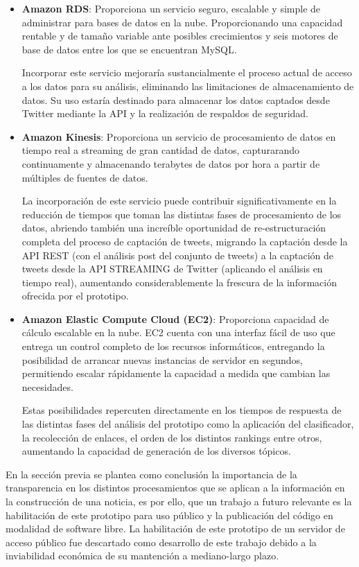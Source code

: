 	\begin{itemize}
		\item \textbf{Amazon RDS}: Proporciona un servicio seguro, escalable y simple de administrar para bases de datos en la nube. Proporcionando una capacidad rentable y de tamaño variable ante posibles crecimientos y seis motores de base de datos entre los que se encuentran MySQL.
		
		Incorporar este servicio mejoraría sustancialmente el proceso actual de acceso a los datos para su análisis, eliminando las limitaciones de almacenamiento de datos. Su uso estaría destinado para almacenar los datos captados desde Twitter mediante la API y la realización de respaldos de seguridad.
		
		\item \textbf{Amazon Kinesis}: Proporciona un servicio de procesamiento de datos en tiempo real a streaming de gran cantidad de datos, capturarando continuamente y almacenando terabytes de datos por hora a partir de múltiples de fuentes de datos.
		
		La incorporación de este servicio puede contribuir significativamente en la reducción de tiempos que toman las distintas fases de procesamiento de los datos, abriendo también una increíble oportunidad de  re-estructuración completa del proceso de captación de tweets, migrando  la captación desde la API REST (con el análisis post del conjunto de tweets) a la captación de tweets desde la API STREAMING de Twitter (aplicando el análisis en tiempo real), aumentando considerablemente la frescura de la información ofrecida por el prototipo.
		
		\item \textbf{Amazon Elastic Compute Cloud (EC2)}: Proporciona capacidad de cálculo escalable en la nube. EC2 cuenta con una interfaz fácil de uso que entrega un control completo de los recursos informáticos, entregando la posibilidad de arrancar nuevas instancias de servidor en segundos, permitiendo escalar rápidamente la capacidad a medida que cambian las necesidades.
		
		Estas posibilidades repercuten directamente en los tiempos de respuesta de las distintas fases del análisis del prototipo como la aplicación del clasificador, la recolección de enlaces, el orden de los distintos rankings entre otros, aumentando la capacidad de generación de los diversos tópicos.
		
	\end{itemize}
	
En la sección previa se plantea como conclusión la importancia de la transparencia en los distintos procesamientos que se aplican a la información en la construcción de una noticia, es por ello, que un trabajo a futuro relevante es la habilitación de este prototipo para uso público y la publicación del código en modalidad de software libre. La habilitación de este prototipo de un servidor de acceso público fue descartado como desarrollo de este trabajo debido a la inviabilidad económica de su mantención a mediano-largo plazo.
	
